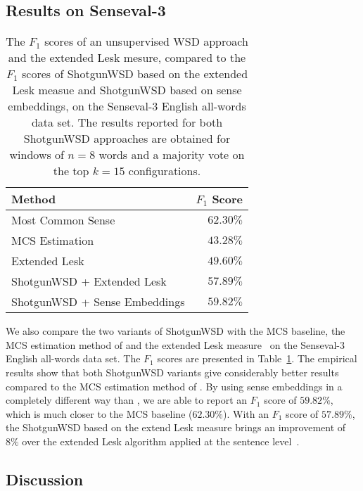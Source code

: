 \documentclass[11pt]{article}
\begin{document}
\subsection{Results on Senseval-3}

\begin{table}[h]
\small{
\begin{center}
\begin{tabular}{|l|r|}
\hline
Method 																										& $F_1$ Score\\
\hline
Most Common Sense																					& $62.30\%$\\
MCS Estimation~\cite{Bhingardive-NAACL-2015} 										& $43.28\%$\\
Extended Lesk~\cite{Torres-Lesk-2009}														& $49.60\%$\\
\hline
ShotgunWSD + Extended Lesk																		& $57.89\%$\\
ShotgunWSD + Sense Embeddings																& $59.82\%$\\
\hline
\end{tabular}
\end{center}
\caption{\label{tab_Senseval3_Results} The $F_1$ scores of an unsupervised WSD approach and the extended Lesk mesure, compared to the $F_1$ scores of ShotgunWSD based on the extended Lesk measue and ShotgunWSD based on sense embeddings, on the Senseval-3 English all-words data set. The results reported for both ShotgunWSD approaches are obtained for windows of $n=8$ words and a majority vote on the top $k=15$ configurations.}
}
\end{table}

We also compare the two variants of ShotgunWSD with the MCS baseline, the MCS estimation method of  and the extended Lesk measure~\cite{Torres-Lesk-2009} on the Senseval-3 English all-words data set. The $F_1$ scores are presented in Table~\ref{tab_Senseval3_Results}. The empirical results show that both ShotgunWSD variants give considerably better results compared to the MCS estimation method of . By using sense embeddings in a completely different way than , we are able to report an $F_1$ score of $59.82\%$, which is much closer to the MCS baseline ($62.30\%$). With an $F_1$ score of $57.89\%$, the ShotgunWSD based on the extend Lesk measure brings an improvement of $8\%$ over the extended Lesk algorithm applied at the sentence level~\cite{Torres-Lesk-2009}.

\subsection{Discussion}
\end{document}
